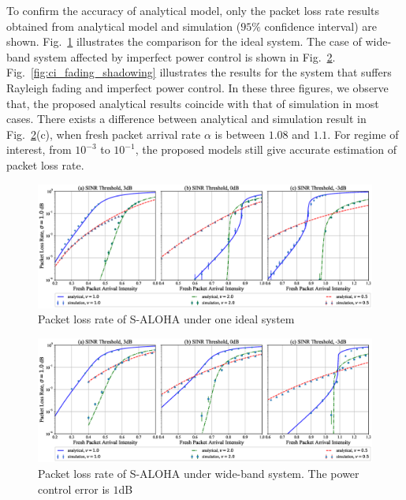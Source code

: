 To confirm the accuracy of analytical model, only the packet loss rate results obtained from analytical model and simulation ($95 \%$ confidence interval) are shown. Fig.~\ref{fig:ideal_ci} illustrates the comparison for the ideal system. The case of wide-band system affected by imperfect power control is shown  in Fig.~\ref{fig:ci}. Fig.~\ref{fig:ci_fading_shadowing} illustrates the results for the system that suffers Rayleigh fading and imperfect power control.
In these three figures, we observe that, the proposed analytical results coincide with that of simulation in most cases. There exists a difference between analytical and simulation result in Fig.~\ref{fig:ci}(c), when fresh packet arrival rate $\alpha$ is between $1.08$ and $1.1$. For regime of interest, from $10^{-3}$ to $10^{-1}$, the proposed models still give accurate estimation of packet loss rate.

\begin{figure}[!ht]
	\centering
	\includegraphics[width=1.0\linewidth]{Chapter4/Figures/packet_loss_rate_ci_with_ideal.eps}
	\caption{Packet loss rate of S-ALOHA under one ideal system}
	\label{fig:ideal_ci}
\end{figure}

\begin{figure}[!ht]
	\centering
	\includegraphics[width=1.0\linewidth]{Chapter4/Figures/packet_loss_rate_ci.eps}
	\caption{Packet loss rate of S-ALOHA under wide-band system. The power control error is $1$dB}
	\label{fig:ci}
\end{figure}

